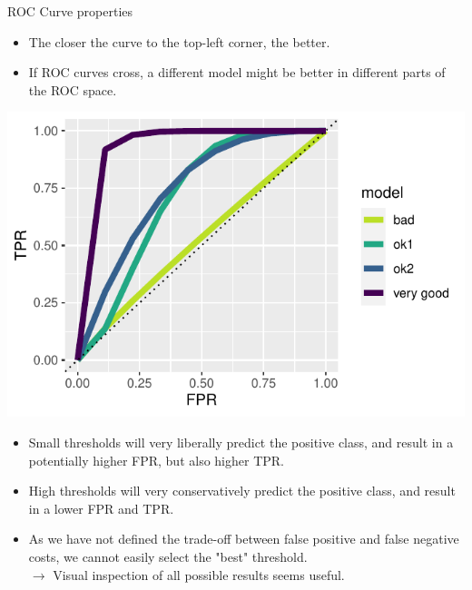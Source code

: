 \documentclass[11pt,compress,t,notes=noshow, xcolor=table]{beamer}
\begin{document}
\begin{vbframe}{ROC Curve properties}

\begin{minipage}[c]{0.5\textwidth}
  \begin{itemize}
    \item The closer the curve to the top-left corner, the better.
    \item If ROC curves cross, a different model might be better in different
    parts of the ROC space.
\end{itemize}
\end{minipage}%
\begin{minipage}[c]{0.5\textwidth}
  \centering
  \includegraphics[width=\textwidth]{figure/eval_mclass_roc_sp_12}
\end{minipage}

\lz

\begin{itemize}
  \item Small thresholds will very liberally predict the positive class, and
  result in a potentially higher FPR, but also higher TPR.
  \item High thresholds will very conservatively predict the positive class,
  and result in a lower FPR and TPR.
  \item As we have not defined the trade-off between false positive and false
  negative costs, we cannot easily select the "best" threshold. \\
  $\rightarrow$ Visual inspection of all possible results seems useful.
\end{itemize}

%


\end{vbframe}
\end{document}
